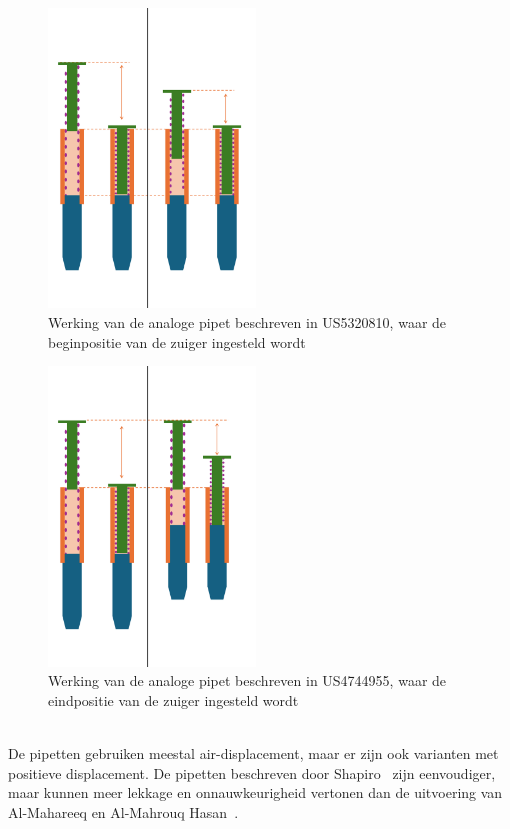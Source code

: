 \begin{minipage}[t]{0.49\textwidth}
    \vspace{0pt}
    \begin{figure}[H]
        \centering
        \captionsetup{width=0.85\textwidth}
        \includegraphics[width=0.49\textwidth]{figures/Werking US5320810.png}
        \caption{Werking van de analoge pipet beschreven in US5320810, waar de beginpositie van de zuiger ingesteld wordt}\label{fig:werking US5320810}
    \end{figure}
\end{minipage}
\begin{minipage}[t]{0.49\textwidth}
    \vspace{0pt}
    \begin{figure}[H]
        \centering
        \captionsetup{width=0.85\textwidth}
        \includegraphics[width=0.49\textwidth]{figures/Werking US4744955.png}
        \caption{Werking van de analoge pipet beschreven in US4744955, waar de eindpositie van de zuiger ingesteld wordt}\label{fig:werking US4744955}
    \end{figure}
\end{minipage}
\\[12pt]De pipetten gebruiken meestal air-displacement, maar er zijn ook varianten met positieve displacement. De pipetten beschreven door Shapiro\ \cite{RN16} zijn eenvoudiger, maar kunnen meer lekkage en onnauwkeurigheid vertonen dan de uitvoering van Al-Mahareeq en Al-Mahrouq Hasan\ \cite{RN17}.

